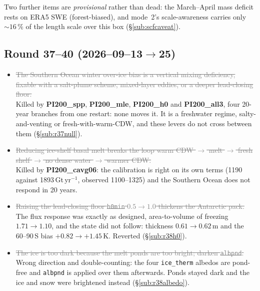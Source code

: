 \documentclass[10pt]{article}
\newcommand{\dead}[1]{\textcolor{gray}{\sout{#1}}}
\begin{document}
\noindent Two further items are \emph{provisional} rather than dead: the March--April mass
deficit rests on ERA5 SWE (forest-biased), and mode~2's scale-awareness carries only
${\sim}16\,\%$ of the length scale over this box (\S\ref{sub:scfcaveat}).

\appendix


\subsection{Round 37--40 (2026--09--13$\to$25)}\label{sub:fals3740}

\begin{itemize}

\item \dead{The Southern Ocean winter over-ice bias is a vertical mixing deficiency, fixable
      with a salt-plume scheme, mixed-layer eddies, or a deeper lead-closing floor.}
      \\ Killed by \textbf{PI200\_spp}, \textbf{PI200\_mle}, \textbf{PI200\_h0} and
      \textbf{PI200\_all3}, four 20-year branches from one restart: none moves it. It is a
      freshwater regime, salty-and-venting or fresh-with-warm-CDW, and these levers do not
      cross between them (\S\ref{sub:r37null}).

\item \dead{Reducing ice-shelf basal melt breaks the loop warm CDW $\to$ melt $\to$ fresh shelf
      $\to$ no dense water $\to$ warmer CDW.} \\ Killed by \textbf{PI200\_cavg06}: the
      calibration is right on its own terms (1190 against 1893\,Gt\,yr$^{-1}$, observed
      1100--1325) and the Southern Ocean does not respond in 20 years.

\item \dead{Raising the lead-closing floor \texttt{h0min} $0.5\to1.0$ thickens the Antarctic
      pack.} \\ The flux response was exactly as designed, area-to-volume of freezing
      $1.71\to1.10$, and the state did not follow: thickness $0.61\to0.62$\,m and the
      60--90\,S bias $+0.82\to+1.45$\,K. Reverted (\S\ref{sub:r38h0}).

\item \dead{The ice is too dark because the melt ponds are too bright; darken \texttt{albpnd}.}
      \\ Wrong direction and double-counting: the four \texttt{ice\_therm} albedos are
      pond-free and \texttt{albpnd} is applied over them afterwards. Ponds stayed dark and the
      ice and snow were brightened instead (\S\ref{sub:r38albedo}).


\end{itemize}
\end{document}
